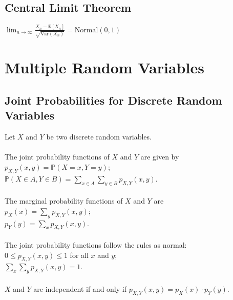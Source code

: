 \documentclass{article}
\begin{document}
		\subsection{Central Limit Theorem}
			$\lim_{n\to\infty} \frac{X_n - \mathbb{R}[X_n]}{\sqrt{\text{Var}(X_n)}} = \text{Normal}(0,1)$ \\
			
	\section{Multiple Random Variables}
		
		\subsection{Joint Probabilities for Discrete Random Variables}
			Let $X$ and $Y$ be two discrete random variables. \\
			\\
			The joint probability functions of $X$ and $Y$ are given by \\
			\textbullet \; $p_{X,Y}(x,y) = \mathbb{P}(X = x, Y = y)$; \\
			\textbullet \; $\mathbb{P}(X \in A, Y \in B) = \sum_{x \in A} \sum_{y \in B} p_{X,Y}(x,y)$. \\
			\\
			The marginal probability functions of $X$ and $Y$ are \\
			\textbullet \; $p_X(x) = \sum_y p_{X,Y}(x,y)$; \\
			\textbullet \; $p_Y(y) = \sum_x p_{X,Y}(x,y)$. \\
			\\
			The joint probability functions follow the rules as normal: \\
			\textbullet \; $0 \leq p_{X,Y}(x,y) \leq 1$ for all $x$ and $y$; \\
			\textbullet \; $\sum_x \sum_y p_{X,Y}(x,y) = 1$. \\
			\\
			$X$ and $Y$ are independent if and only if $p_{X,Y}(x,y) = p_X(x) \cdot p_Y(y)$. \\
			
\end{document}
